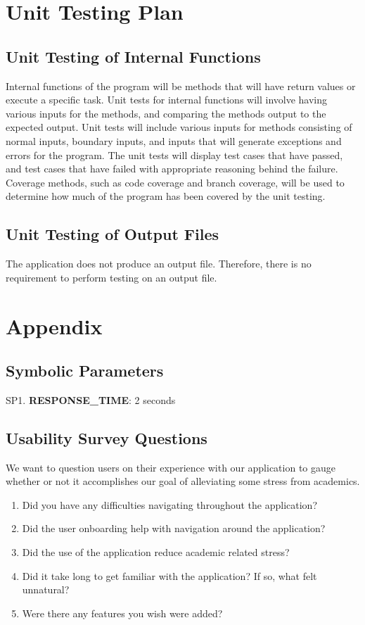\documentclass[12pt, titlepage]{article}
\begin{document}
\section{Unit Testing Plan}

\subsection{Unit Testing of Internal Functions}

Internal functions of the program will be methods that will have return values or execute a specific task. Unit tests for internal functions will involve having various inputs for the methods, and comparing the methods output to the expected output. Unit tests will include various inputs for methods consisting of normal inputs, boundary inputs, and inputs that will generate exceptions and errors for the program. The unit tests will display test cases that have passed, and test cases that have failed with appropriate reasoning behind the failure. Coverage methods, such as code coverage and branch coverage, will be used to determine how much of the program has been covered by the unit testing.

\subsection{Unit Testing of Output Files}

The application does not produce an output file. Therefore, there is no requirement to perform testing on an output file.

\section{Appendix}

\subsection{Symbolic Parameters}

SP1. \textbf{RESPONSE\_TIME}: 2 seconds

\subsection{Usability Survey Questions}

We want to question users on their experience with our application to gauge whether or not it accomplishes our goal of alleviating some stress from academics. \\

\begin{enumerate}
\item{Did you have any difficulties navigating throughout the application?}
\item{Did the user onboarding help with navigation around the application?}
\item{Did the use of the application reduce academic related stress?}
\item{Did it take long to get familiar with the application? If so, what felt unnatural?}
\item{Were there any features you wish were added?}
\end{enumerate}
\end{document}
